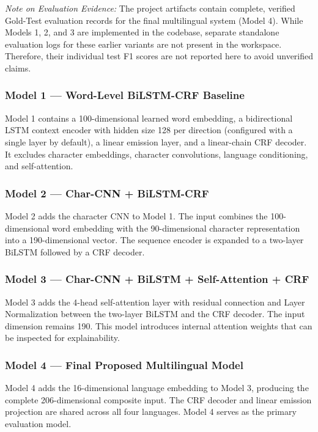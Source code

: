 \documentclass[pdflatex,sn-mathphys-num]{sn-jnl}
\begin{document}
\textit{Note on Evaluation Evidence:} The project artifacts contain complete, verified Gold-Test evaluation records for the final multilingual system (Model 4). While Models 1, 2, and 3 are implemented in the codebase, separate standalone evaluation logs for these earlier variants are not present in the workspace. Therefore, their individual test F1 scores are not reported here to avoid unverified claims.

\subsubsection{Model 1 --- Word-Level BiLSTM-CRF Baseline}
Model 1 contains a 100-dimensional learned word embedding, a bidirectional LSTM context encoder with hidden size 128 per direction (configured with a single layer by default), a linear emission layer, and a linear-chain CRF decoder. It excludes character embeddings, character convolutions, language conditioning, and self-attention.

\subsubsection{Model 2 --- Char-CNN + BiLSTM-CRF}
Model 2 adds the character CNN to Model 1. The input combines the 100-dimensional word embedding with the 90-dimensional character representation into a 190-dimensional vector. The sequence encoder is expanded to a two-layer BiLSTM followed by a CRF decoder.

\subsubsection{Model 3 --- Char-CNN + BiLSTM + Self-Attention + CRF}
Model 3 adds the 4-head self-attention layer with residual connection and Layer Normalization between the two-layer BiLSTM and the CRF decoder. The input dimension remains 190. This model introduces internal attention weights that can be inspected for explainability.

\subsubsection{Model 4 --- Final Proposed Multilingual Model}
Model 4 adds the 16-dimensional language embedding to Model 3, producing the complete 206-dimensional composite input. The CRF decoder and linear emission projection are shared across all four languages. Model 4 serves as the primary evaluation model.
\end{document}
